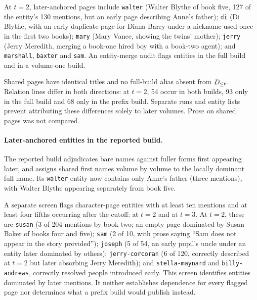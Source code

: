 At $t=2$, later-anchored pages include \texttt{walter} (Walter Blythe of book five,
127 of the entity's 130 mentions, but an early page describing Anne's father);
\texttt{di} (Di Blythe, with an early duplicate page for Diana Barry under a nickname
used once in the first two books); \texttt{mary} (Mary Vance, showing the twins' mother);
\texttt{jerry} (Jerry Meredith, merging a book-one hired boy with a book-two agent);
and \texttt{marshall}, \texttt{baxter} and \texttt{sam}.
An entity-merge audit flags  entities in the full build and
 in a volume-one build.

Shared pages have identical titles and no full-build alias absent from $D_{\le t}$.
Relation lines differ in both directions: at $t=2$, 54 occur in both builds,
93 only in the full build and 68 only in the prefix build. Separate runs and
entity lists prevent attributing these differences solely to later volumes.
Prose on shared pages was not compared.

\paragraph{Later-anchored entities in the reported build.}
The reported build adjudicates bare names against fuller forms first appearing later,
and assigns shared first names volume by volume to the locally dominant full name.
Its \texttt{walter} entity now contains only Anne's father (three mentions), with
Walter Blythe appearing separately from book five.

A separate screen flags character-page entities with at least ten mentions and
at least four fifths occurring after the cutoff:  at $t=2$ and
 at $t=3$. At $t=2$, these are \texttt{susan} (3 of 204 mentions
by book two; an empty page dominated by Susan Baker of books four and five);
\texttt{sam} (2 of 10, with prose saying ``Sam does not appear in the story provided'');
\texttt{joseph} (5 of 54, an early pupil's uncle under an entity later dominated by
others); \texttt{jerry-corcoran} (6 of 120, correctly described at $t=2$ but later
absorbing Jerry Meredith); and \texttt{stella-maynard} and \texttt{billy-andrews},
correctly resolved people introduced early. This screen identifies entities dominated
by later mentions. It neither establishes dependence for every flagged page nor
determines what a prefix build would publish instead.

